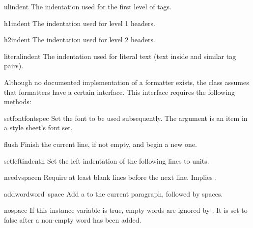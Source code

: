 \begin{datadesc}{ulindent}
The indentation used for the first level of  tags.
\end{datadesc}

\begin{datadesc}{h1indent}
The indentation used for level 1 headers.
\end{datadesc}

\begin{datadesc}{h2indent}
The indentation used for level 2 headers.
\end{datadesc}

\begin{datadesc}{literalindent}
The indentation used for literal text (text inside
 and similar tag pairs).
\end{datadesc}

Although no documented implementation of a formatter exists, the
 class assumes that formatters have a
certain interface.  This interface requires the following methods:

\begin{funcdesc}{setfont}{fontspec}
Set the font to be used subsequently.  The  argument is
an item in a style sheet's font set.
\end{funcdesc}

\begin{funcdesc}{flush}{}
Finish the current line, if not empty, and begin a new one.
\end{funcdesc}

\begin{funcdesc}{setleftindent}{n}
Set the left indentation of the following lines to  units.
\end{funcdesc}

\begin{funcdesc}{needvspace}{n}
Require at least  blank lines before the next line.  Implies
.
\end{funcdesc}

\begin{funcdesc}{addword}{word\, space}
Add a  to the current paragraph, followed by 
spaces.
\end{funcdesc}

\begin{datadesc}{nospace}
If this instance variable is true, empty words are ignored by
.  It is set to false after a non-empty word has been
added.
\end{datadesc}

